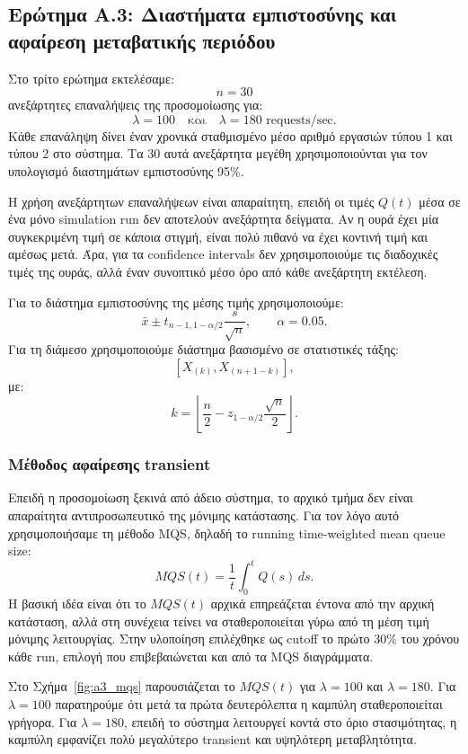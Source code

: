 \documentclass{article}
\begin{document}
\newpage
\subsection{Ερώτημα A.3: Διαστήματα εμπιστοσύνης και αφαίρεση μεταβατικής περιόδου}

Στο τρίτο ερώτημα εκτελέσαμε:
\[
    n=30
\]
ανεξάρτητες επαναλήψεις της προσομοίωσης για:
\[
    \lambda = 100
    \quad \text{και} \quad
    \lambda = 180
    \text{ requests/sec}.
\]
Κάθε επανάληψη δίνει έναν χρονικά σταθμισμένο μέσο αριθμό εργασιών τύπου 1 και τύπου 2 στο σύστημα. Τα $30$ αυτά ανεξάρτητα μεγέθη χρησιμοποιούνται για τον υπολογισμό διαστημάτων εμπιστοσύνης 95\%.

Η χρήση ανεξάρτητων επαναλήψεων είναι απαραίτητη, επειδή οι τιμές $Q(t)$ μέσα σε ένα μόνο simulation run δεν αποτελούν ανεξάρτητα δείγματα. Αν η ουρά έχει μία συγκεκριμένη τιμή σε κάποια στιγμή, είναι πολύ πιθανό να έχει κοντινή τιμή και αμέσως μετά. Άρα, για τα confidence intervals δεν χρησιμοποιούμε τις διαδοχικές τιμές της ουράς, αλλά έναν συνοπτικό μέσο όρο από κάθε ανεξάρτητη εκτέλεση.

Για το διάστημα εμπιστοσύνης της μέσης τιμής χρησιμοποιούμε:
\[
    \bar{x} \pm t_{n-1,1-\alpha/2}\frac{s}{\sqrt{n}},
    \qquad
    \alpha=0.05.
\]
Για τη διάμεσο χρησιμοποιούμε διάστημα βασισμένο σε στατιστικές τάξης:
\[
    [X_{(k)}, X_{(n+1-k)}],
\]
με:
\[
    k =
    \left\lfloor
    \frac{n}{2} - z_{1-\alpha/2}\frac{\sqrt{n}}{2}
    \right\rfloor.
\]

\subsubsection{Μέθοδος αφαίρεσης transient}

Επειδή η προσομοίωση ξεκινά από άδειο σύστημα, το αρχικό τμήμα δεν είναι απαραίτητα αντιπροσωπευτικό της μόνιμης κατάστασης. Για τον λόγο αυτό χρησιμοποιήσαμε τη μέθοδο MQS, δηλαδή το running time-weighted mean queue size:
\[
    MQS(t) = \frac{1}{t}\int_0^t Q(s)\,ds.
\]
Η βασική ιδέα είναι ότι το $MQS(t)$ αρχικά επηρεάζεται έντονα από την αρχική κατάσταση, αλλά στη συνέχεια τείνει να σταθεροποιείται γύρω από τη μέση τιμή μόνιμης λειτουργίας. Στην υλοποίηση επιλέχθηκε ως cutoff το πρώτο $30\%$ του χρόνου κάθε run, επιλογή που επιβεβαιώνεται και από τα MQS διαγράμματα.

Στο Σχήμα~\ref{fig:a3_mqs} παρουσιάζεται το $MQS(t)$ για $\lambda=100$ και $\lambda=180$. Για $\lambda=100$ παρατηρούμε ότι μετά τα πρώτα δευτερόλεπτα η καμπύλη σταθεροποιείται γρήγορα. Για $\lambda=180$, επειδή το σύστημα λειτουργεί κοντά στο όριο στασιμότητας, η καμπύλη εμφανίζει πολύ μεγαλύτερο transient και υψηλότερη μεταβλητότητα.
\end{document}
